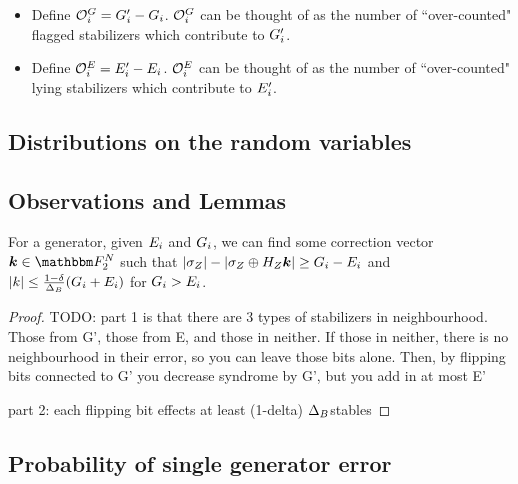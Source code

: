 \begin{itemize}
	\item Define $\mathcal{O}^G_i = {G'_i} - {G_i}$. $\mathcal{O}^G_i$ can be thought of as the
	number of ``over-counted" flagged stabilizers which contribute to ${G'_i}$.
	\item Define $\mathcal{O}^E_i = {E'_i} - {E_i}$. $\mathcal{O}^E_i$ can be thought of as the
	number of ``over-counted" lying stabilizers which contribute to ${E'_i}$.
\end{itemize}

\subsection*{Distributions on the random variables}

\subsection*{Observations and Lemmas}


\begin{lemma}{For a generator, given ${E_i}$ and ${G_i}$,
	we can find some correction vector $\correctionvec \in \F_2^\NQubits$
	such that \linebreak $|\sigma_Z| - |\sigma_Z \oplus H_Z\boldsymbol{\boldsymbol{k}}| \geq {G_i} - {E_i}$}
	and $|k| \leq \frac{1-\delta}{\Delta_{B}} ({G_i} + {E_i})$ for ${G_i} > {E_i}$.
\label{lemma:decrby}
	\begin{proof}
		TODO:	 part 1 is that there are 3 types of stabilizers in neighbourhood.
		Those from G', those from E, and those in neither. If those in neither, there is no
		neighbourhood in their error, so you can leave those bits alone. Then, by flipping bits
		connected to G' you decrease syndrome by G', but you add in at most E'
		
		part 2: each flipping bit effects at least (1-delta) $\Delta_{B}$stables
	\end{proof}
\end{lemma}



\subsection*{Probability of single generator error}

